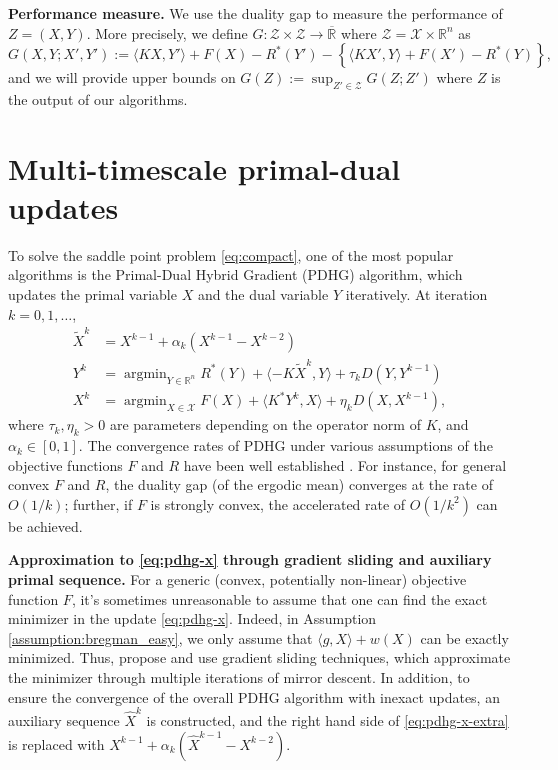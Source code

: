 \documentclass[10pt]{article}
\newcommand{\mc}{\mathcal}
\newcommand{\R}{\mathbb{R}}
\DeclareMathOperator*{\argmin}{argmin}
\begin{document}
\textbf{Performance measure.} We use the duality gap to measure the performance of $Z = (X,Y)$. More precisely, we define $G:\mc Z\times \mc Z\to\overline{\R}$ where $\mc Z = \mc X\times \R^n$ as
    \begin{equation}\label{eq:def_gap}
        G(X,Y;X',Y'):=  \langle KX,Y'\rangle + F(X) - R^*(Y')- \left\{\langle KX',Y\rangle + F(X') - R^*(Y)\right\},
\end{equation}
and we will provide upper bounds on $G(Z):=\sup_{Z'\in \mc Z} G(Z;Z')$ where $Z$ is the output of our algorithms. 


\section{Multi-timescale primal-dual updates}\label{sec:mupdhg}
To solve the saddle point problem \eqref{eq:compact}, one of the most popular algorithms is the Primal-Dual Hybrid Gradient (PDHG) algorithm\cite{chambolle_first-order_2011,lan_communication-efficient_2020,Chambolle2018Stochastic}, which updates the primal variable $X$ and the dual variable $Y$ iteratively. At iteration $k=0,1,\ldots$,
\begin{subequations}\label{eq:pdhg}
\begin{align}
    \widetilde{X}^{k} & = X^{k-1} + \alpha_k(X^{k-1}-X^{k-2})\label{eq:pdhg-x-extra}\\
    Y^{k} &=\argmin_{Y\in \R^n} R^*(Y)+ \langle -K\widetilde{X}^{k},Y\rangle + \tau_k D(Y,Y^{k-1})\label{eq:pdhg-y}\\
    X^{k} &= \argmin_{X\in \mc X} F(X)+
    \langle K^*Y^k,X\rangle + \eta_k D(X,X^{k-1}),\label{eq:pdhg-x}
\end{align}
\end{subequations}
where $\tau_k,\eta_k>0$ are parameters depending on the operator norm of $K$, and $\alpha_k\in [0,1]$. The convergence rates of PDHG under various assumptions of the objective functions $F$ and $R$ have been well established \cite{chambolle_first-order_2011}. For instance, for general convex $F$ and $R$, the duality gap (of the ergodic mean) converges at the rate of $O(1/k)$; further, if $F$ is strongly convex, the accelerated rate of $O(1/k^2)$ can be achieved. 

\textbf{Approximation to \eqref{eq:pdhg-x} through gradient sliding and auxiliary primal sequence.} For a generic (convex, potentially non-linear) objective function $F$, it's sometimes unreasonable to assume that one can find the exact minimizer in the update \eqref{eq:pdhg-x}. Indeed, in Assumption \ref{assumption:bregman_easy}, we only assume that $\langle g,X\rangle + w(X)$ can be exactly minimized. Thus, \cite{lan_gradient_2016,lan_communication-efficient_2020} propose and use gradient sliding techniques, which approximate the minimizer through multiple iterations of mirror descent. In addition, to ensure the convergence of the overall PDHG algorithm with inexact updates, an auxiliary sequence $\widehat{X}^k$ is constructed, and the right hand side of \eqref{eq:pdhg-x-extra} is replaced with $X^{k-1} + \alpha_k(\widehat{X}^{k-1}-X^{k-2})$. 
\end{document}
